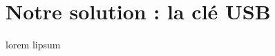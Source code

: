 \section{Notre solution : la clé USB}
\begin{frame}
\tableofcontents[currentsection]
\end{frame}
\begin{frame}
lorem lipsum
\end{frame}